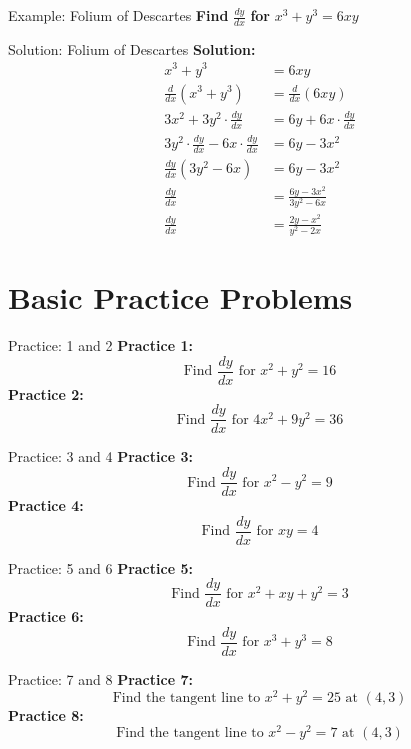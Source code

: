 \documentclass[aspectratio=169]{beamer}
\begin{document}
\begin{frame}{Example: Folium of Descartes}
\textbf{Find } $\frac{dy}{dx}$ \textbf{ for } $x^3 + y^3 = 6xy$
\end{frame}

\begin{frame}{Solution: Folium of Descartes}
\textbf{Solution:}
\[
\begin{aligned}
  x^3 + y^3 &= 6xy \\
  \frac{d}{dx}(x^3 + y^3) &= \frac{d}{dx}(6xy) \\
  3x^2 + 3y^2 \cdot \frac{dy}{dx} &= 6y + 6x \cdot \frac{dy}{dx} \\
  3y^2 \cdot \frac{dy}{dx} - 6x \cdot \frac{dy}{dx} &= 6y - 3x^2 \\
  \frac{dy}{dx}(3y^2 - 6x) &= 6y - 3x^2 \\
  \frac{dy}{dx} &= \frac{6y - 3x^2}{3y^2 - 6x} \\
  \frac{dy}{dx} &= \frac{2y - x^2}{y^2 - 2x}
\end{aligned}
\]
\end{frame}

\section{Basic Practice Problems}

\begin{frame}{Practice: 1 and 2}
\textbf{Practice 1:}
\[
\text{Find } \frac{dy}{dx} \text{ for } x^2 + y^2 = 16
\]
\vspace{1em}
\textbf{Practice 2:}
\[
\text{Find } \frac{dy}{dx} \text{ for } 4x^2 + 9y^2 = 36
\]
\end{frame}

\begin{frame}{Practice: 3 and 4}
\textbf{Practice 3:}
\[
\text{Find } \frac{dy}{dx} \text{ for } x^2 - y^2 = 9
\]
\vspace{1em}
\textbf{Practice 4:}
\[
\text{Find } \frac{dy}{dx} \text{ for } xy = 4
\]
\end{frame}

\begin{frame}{Practice: 5 and 6}
\textbf{Practice 5:}
\[
\text{Find } \frac{dy}{dx} \text{ for } x^2 + xy + y^2 = 3
\]
\vspace{1em}
\textbf{Practice 6:}
\[
\text{Find } \frac{dy}{dx} \text{ for } x^3 + y^3 = 8
\]
\end{frame}

\begin{frame}{Practice: 7 and 8}
\textbf{Practice 7:}
\[
\text{Find the tangent line to } x^2 + y^2 = 25 \text{ at } (4, 3)
\]
\vspace{1em}
\textbf{Practice 8:}
\[
\text{Find the tangent line to } x^2 - y^2 = 7 \text{ at } (4, 3)
\]
\end{frame}
\end{document}
